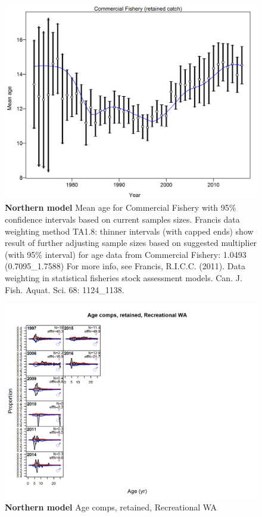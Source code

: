 \documentclass[12pt,]{article}
\begin{document}
\begin{figure}[htbp]
\centering
\includegraphics{./r4ss/plots_mod1/comp_agefit_data_weighting_TA1.8_Commercial Fishery.png}
\caption{\textbf{Northern model} Mean age for Commercial Fishery with
95\% confidence intervals based on current samples sizes. Francis data
weighting method TA1.8: thinner intervals (with capped ends) show result
of further adjusting sample sizes based on suggested multiplier (with
95\% interval) for age data from Commercial Fishery: 1.0493
(0.7095\_1.7588) For more info, see Francis, R.I.C.C. (2011). Data
weighting in statistical fisheries stock assessment models. Can. J.
Fish. Aquat. Sci. 68: 1124\_1138.
\label{fig:mod1_5_comp_agefit_data_weighting_TA1.8_Commercial Fishery}}
\end{figure}

\begin{figure}[htbp]
\centering
\includegraphics{./r4ss/plots_mod1/comp_agefit_flt4mkt2.png}
\caption{\textbf{Northern model} Age comps, retained, Recreational WA
\label{fig:mod1_6_comp_agefit_flt4mkt2}}
\end{figure}
\end{document}
